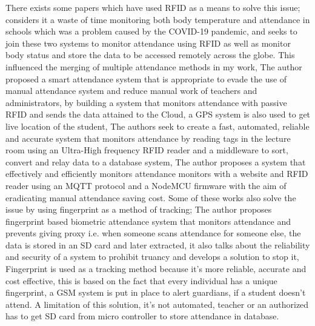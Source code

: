 There exists some papers which have used RFID as a means to solve this issue;
\cite{KaziARP} considers it a waste of time monitoring both body temperature and attendance in schools which was a problem caused by the COVID-19 pandemic, and seeks to join these two systems to monitor attendance using RFID as well as monitor body status and store the data to be accessed remotely across the globe. This influenced the merging of multiple attendance methods in my work,
The author proposed a smart attendance system that is appropriate to evade the use of manual attendance system and reduce manual work of teachers and administrators, by building a system that monitors attendance with passive RFID and sends the data attained to the Cloud, a GPS system is also used to get live location of the student\cite{Tt2021}, The authors seek to create a fast, automated, reliable and accurate system that monitors attendance by reading tags in the lecture room using an Ultra-High frequency RFID reader and a middleware to sort, convert and relay data to a database system\cite{Www2012}, The author proposes a system that effectively and efficiently monitors attendance monitors with a website and RFID reader using an MQTT protocol and a NodeMCU firmware with the aim of eradicating manual attendance saving cost\cite{Bhagat2020}.
Some of these works also solve the issue by using fingerprint as a method of tracking;
The author proposes fingerprint based biometric attendance system that monitors attendance and prevents giving proxy i.e. when someone scans attendance for someone else, the data is stored in an SD card and later extracted, it also talks about the reliability and security of a system to prohibit truancy and develops a solution to stop it, Fingerprint is used as a tracking method because it's more reliable, accurate and cost effective, this is based on the fact that every individual has a unique fingerprint, a GSM system is put in place to alert guardians, if a student doesn't attend\cite{soe2018implementation}. A limitation of this solution, it's not automated, teacher or an authorized has to get SD card from micro controller to store attendance in database.

